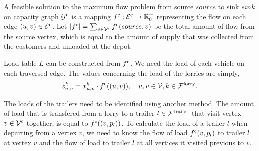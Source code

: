 A feasible solution to the maximum flow problem   from source
$source$
to sink
$sink$
on capacity graph
$ \mathcal G^{\rm c}$
is a mapping
$ f^{\rm c}: \mathcal E^{\rm c} \rightarrow \mathbb{R}^+_0$
representing the flow on each edge
$(u,v) \in \mathcal E^{\rm c}$.
Let
$|f^{\rm c}| = \sum_{v \in \mathcal V^{\rm c}} f^{\rm c}(source, v)$
be the total amount of flow from the source vertex, which is equal to the amount of supply that was collected from the customers and unloaded at the depot.

Load table $L$ can be constructed from $f^{\rm c}$.
We need the load of each vehicle on each traversed edge. The values concerning the load of the lorries are simply,
\begin{align}
	\label{eq:lorry_load}
	z^{k}_{u,v} =
	x^k_{u,v} \cdot f^{\rm c}((u,v)) ,  \quad u,v \in \mathcal V,
   k \in \mathcal F^{\rm lorry}. \notag
\end{align}

The loads of the trailers need to be identified using another method.
The  amount of load that is transfered from a lorry to a trailer
 $l \in \mathcal F^{\rm trailer}$
 that visit vertex $v \in \mathcal V^{\rm c}$ together, is equal to
 $f^{\rm c}((v,p_l))$.
To calculate the load of a trailer $l$ when departing from a vertex $v$,
we need to know the flow of load $f^{\rm c}(v,p_l)$ to trailer $l$ at vertex $v$ and the flow of load to trailer $l$ at all vertices it visited previous to $v$.  \\

